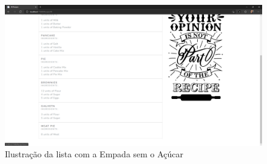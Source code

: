 \FloatBarrier
\begin{figure}[!hbt]
    \centering
    \includegraphics[width=14cm]{Resources/WebApp/Recipes/recipe (19).png}
    \caption{Ilustração da lista com a Empada sem o Açúcar}
    \label{fig:app_rec_19}
\end{figure}
\FloatBarrier